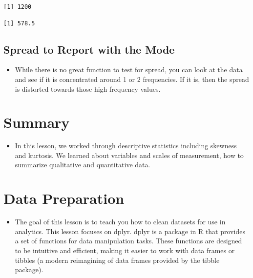 \documentclass[
  letterpaper,
  DIV=11,
  numbers=noendperiod]{scrreprt}
\newenvironment{Shaded}{\begin{snugshade}}{\end{snugshade}}
\newcommand{\AttributeTok}[1]{\textcolor[rgb]{0.40,0.45,0.13}{#1}}
\newcommand{\ConstantTok}[1]{\textcolor[rgb]{0.56,0.35,0.01}{#1}}
\newcommand{\FunctionTok}[1]{\textcolor[rgb]{0.28,0.35,0.67}{#1}}
\newcommand{\NormalTok}[1]{\textcolor[rgb]{0.00,0.23,0.31}{#1}}
\newcommand{\SpecialCharTok}[1]{\textcolor[rgb]{0.37,0.37,0.37}{#1}}
\providecommand{\tightlist}{%
  \setlength{\itemsep}{0pt}\setlength{\parskip}{0pt}}\usepackage{longtable,booktabs,array}
\begin{document}
\begin{verbatim}
[1] 1200
\end{verbatim}

\begin{Shaded}
\end{Shaded}

\begin{verbatim}
[1] 578.5
\end{verbatim}

\section{Spread to Report with the
Mode}\label{spread-to-report-with-the-mode}

\begin{itemize}
\tightlist
\item
  While there is no great function to test for spread, you can look at
  the data and see if it is concentrated around 1 or 2 frequencies. If
  it is, then the spread is distorted towards those high frequency
  values.
\end{itemize}


\chapter{Summary}\label{summary-2}

\begin{itemize}
\tightlist
\item
  In this lesson, we worked through descriptive statistics including
  skewness and kurtosis. We learned about variables and scales of
  measurement, how to summarize qualitative and quantitative data.
\end{itemize}


\chapter{Data Preparation}\label{data-preparation}

\begin{itemize}
\tightlist
\item
  The goal of this lesson is to teach you how to clean datasets for use
  in analytics. This lesson focuses on dplyr. dplyr is a package in R
  that provides a set of functions for data manipulation tasks. These
  functions are designed to be intuitive and efficient, making it easier
  to work with data frames or tibbles (a modern reimagining of data
  frames provided by the tibble package).
\end{itemize}
\end{document}

